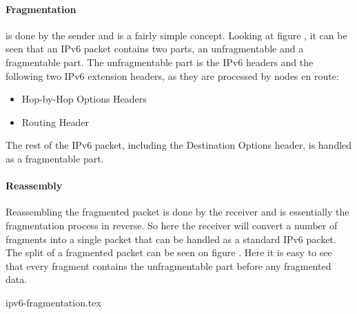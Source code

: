 \documentclass{report}
\begin{document}
\paragraph{Fragmentation} is done by the sender and is a fairly simple concept. Looking at figure , it can be seen that an IPv6 packet contains two parts, an unfragmentable and a fragmentable part. The unfragmentable part is the IPv6 headers and the following two IPv6 extension headers, as they are processed by nodes en route:

\begin{itemize}
    \item Hop-by-Hop Options Headers
    \item Routing Header
\end{itemize}

The rest of the IPv6 packet, including the Destination Options header, is handled as a fragmentable part.

\paragraph{Reassembly} Reassembling the fragmented packet is done by the receiver and is essentially the fragmentation process in reverse. So here the receiver will convert a number of fragments into a single packet that can be handled as a standard IPv6 packet. The split of a fragmented packet can be seen on figure . Here it is easy to see that every fragment contains the unfragmentable part before any fragmented data.

{ipv6-fragmentation.tex}
\end{document}
